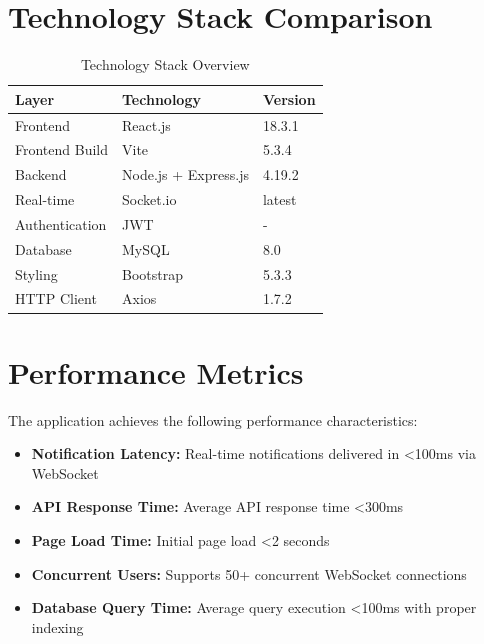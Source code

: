 \documentclass[12pt]{report}
\begin{document}
\section{Technology Stack Comparison}

\begin{table}[h!]
  \begin{center}
    \caption{Technology Stack Overview}
    \label{tab:tech_stack}
    \begin{tabular}{|l|l|l|} 
      \hline
      \textbf{Layer} & \textbf{Technology} & \textbf{Version}\\
      \hline
      Frontend & React.js & 18.3.1 \\
      \hline
      Frontend Build & Vite & 5.3.4 \\
      \hline
      Backend & Node.js + Express.js & 4.19.2 \\
      \hline
      Real-time & Socket.io & latest \\
      \hline
      Authentication & JWT & - \\
      \hline
      Database & MySQL & 8.0 \\
      \hline
      Styling & Bootstrap & 5.3.3 \\
      \hline
      HTTP Client & Axios & 1.7.2 \\
      \hline
    \end{tabular}
  \end{center}
\end{table}

\section{Performance Metrics}

The application achieves the following performance characteristics:

\begin{itemize}
\item \textbf{Notification Latency:} Real-time notifications delivered in <100ms via WebSocket
\item \textbf{API Response Time:} Average API response time <300ms
\item \textbf{Page Load Time:} Initial page load <2 seconds
\item \textbf{Concurrent Users:} Supports 50+ concurrent WebSocket connections
\item \textbf{Database Query Time:} Average query execution <100ms with proper indexing
\end{itemize}
\end{document}
